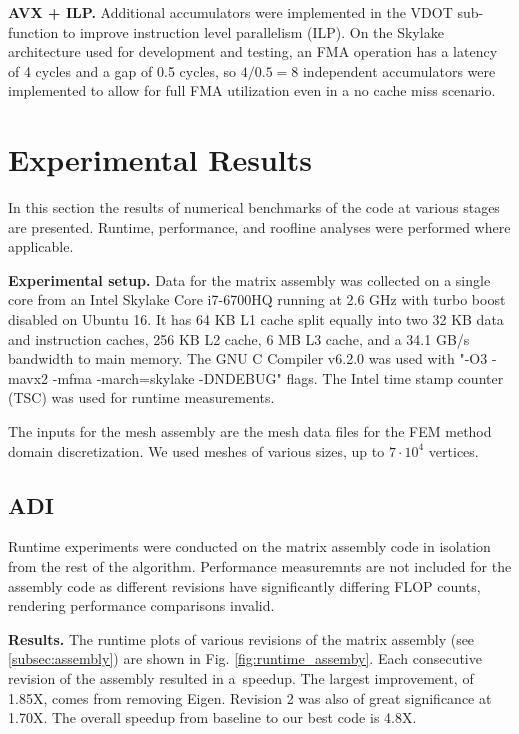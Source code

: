 \documentclass[letterpaper]{article}
\newcommand{\mypar}[1]{{\bf #1.}}
\begin{document}
\mypar{AVX + ILP}
Additional accumulators were implemented in the VDOT sub-function to improve instruction level parallelism (ILP). On the Skylake architecture used for development and testing, an FMA operation has a latency of 4 cycles and a gap of 0.5 cycles, so $4/0.5=8$ independent accumulators were implemented to allow for full FMA utilization even in a no cache miss scenario.


\section{Experimental Results}\label{sec:exp}

In this section the results of numerical benchmarks of the code at various stages are presented. Runtime, performance, and roofline analyses were performed where applicable.

\mypar{Experimental setup}
Data for the matrix assembly was collected on a single core from an Intel Skylake Core i7-6700HQ running at 2.6 GHz with turbo boost disabled on Ubuntu 16. It has 64 KB L1 cache split equally into two 32 KB data and instruction caches, 256 KB L2 cache, 6 MB L3 cache, and a 34.1 GB/s bandwidth to main memory. The GNU C Compiler v6.2.0 was used with "-O3 -mavx2 -mfma -march=skylake -DNDEBUG" flags. The Intel time stamp counter (TSC) was used for runtime measurements.

The inputs for the mesh assembly are the mesh data files for the FEM method domain discretization. We used meshes of various sizes, up to $7\cdot10^4$ vertices.

\subsection{ADI}\label{subsec:ADI_results}
Runtime experiments were conducted on the matrix assembly code in isolation from the rest of the algorithm. Performance measuremnts are not included for the assembly code as different revisions have significantly differing FLOP counts, rendering performance comparisons invalid.

\mypar{Results}
The runtime plots of various revisions of the matrix assembly (see \ref{subsec:assembly}) are shown in Fig. \ref{fig:runtime_assemby}. Each consecutive revision of the assembly resulted in a~speedup. The largest improvement, of 1.85X, comes from removing Eigen.
Revision 2 was also of great significance at 1.70X.
The overall speedup from baseline to our best code is 4.8X.
\end{document}
